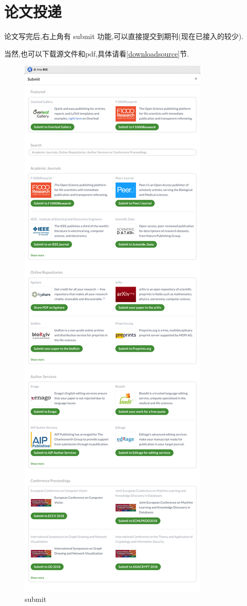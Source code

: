 \documentclass[]{ctexbook}
\begin{document}
\hypertarget{section-8}{%
\section{论文投递}\label{section-8}}

论文写完后,右上角有 submit 功能,可以直接提交到期刊(现在已接入的较少).

当然,也可以下载源文件和pdf,具体请看\ref{downloadsource}节.

\begin{figure}
\centering
\includegraphics{figure/submit.jpg}
\caption{submit}
\end{figure}
\end{document}

